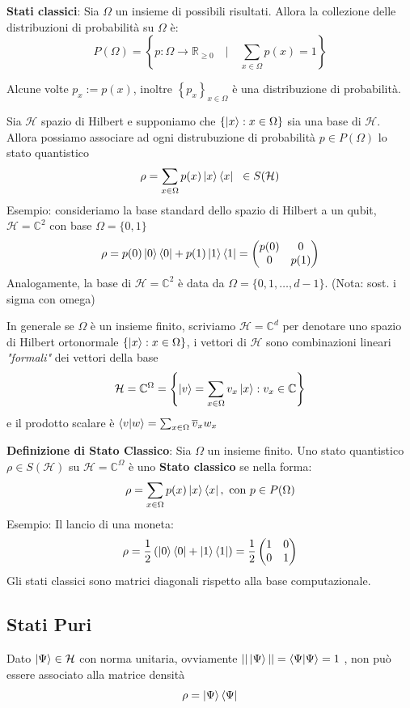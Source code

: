 \documentclass{report}
\begin{document}
\textbf{Stati classici}: Sia $\Omega$ un insieme di possibili risultati. Allora la collezione delle distribuzioni di probabilità su $\Omega$ è: $$P(\Omega)=\left\{p : \Omega\rightarrow\mathbb{R}_{\ge0}\quad|\quad\sum_{x \in \Omega}p(x)=1\right\}$$

Alcune volte $p_x:= p(x)$, inoltre $\left\{p_x \right\}_{x\in \Omega}$ è una distribuzione di probabilità.

Sia $\mathcal{H}$ spazio di Hilbert e supponiamo che $\left\{ \ket{x}:x \in \Omega \right\}$ sia una base di $\mathcal{H}$.
Allora possiamo associare ad ogni distrubuzione di probabilità $p \in P(\Omega)$ lo stato quantistico
$$\rho  = \sum_{x \in \Omega} p(x)\ket{x}\bra{x} \hspace{0.2cm} \in S(\mathcal{H})$$
Esempio: consideriamo la base standard dello spazio di Hilbert a un qubit, $\mathcal{H}= \mathbb{C}^2$ con base $\Omega = \{0,1\}$
$$\rho = p(0) \ket{0}\bra{0}+p(1) \ket{1}\bra{1}=
\begin{pmatrix}
    p(0) & 0\\
    0 & p(1) \\
\end{pmatrix}
$$
Analogamente, la base di $\mathcal{H} = \mathbb{C}^2$ è data da $\Omega = \{0,1,\dots,d-1\}$. (Nota: sost. i sigma con omega)

In generale se $\Omega$ è un insieme finito, scriviamo $\mathcal{H}= \mathbb{C}^d$ per denotare uno spazio di Hilbert ortonormale $\left\{ \ket{x}:x \in \Omega  \right\}$, i vettori di $\mathcal{H}$ sono combinazioni lineari \textit{"formali"} dei vettori della base
$$\mathcal{H} = \mathbb{C}^\Omega = \left\{ \ket{v} = \sum_{x\in \Omega} v_x \ket{x}:v_x \in \mathbb{C}\right\}$$
e il prodotto scalare è $\braket{v|w}=\sum_{x\in \Omega} \overline{v}_x w_x$

\medskip
\textbf{Definizione di Stato Classico}: Sia $\Omega$ un insieme finito. Uno stato quantistico $\rho \in S(\mathcal{H})$ su $\mathcal{H}= \mathbb{C}^\Omega$ è uno \textbf{Stato classico} se nella forma: $$\rho = \sum_{x\in \Omega}p(x)\ket{x}\bra{x}, \text{ con } p\in P(\Omega)$$
Esempio: Il lancio di una moneta: 
$$\rho = \frac{1}{2}\left( \ket{0} \bra{0}+ \ket{1}\bra{1}\right)= 
\frac{1}{2}
\begin{pmatrix}
    1 & 0\\
    0 & 1
\end{pmatrix}
$$
Gli stati classici sono matrici diagonali rispetto alla base computazionale.

\subsection{Stati Puri}
Dato $\ket{\Psi} \in \mathcal{H}$ con norma unitaria, ovviamente $||\ket{\Psi}|| = \braket{\Psi|\Psi}=1$ , non può essere associato alla matrice densità
$$\rho = \ket{\Psi} \bra{\Psi}$$
\end{document}
